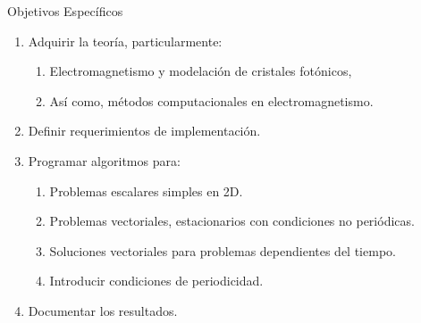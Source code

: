 \documentclass[xcolor=table,serif,handout]{beamer}
\begin{document}
		\begin{frame}
		\begin{block}{Objetivos Espec\'ificos}
	    \begin{enumerate}
			\item Adquirir la teoría, particularmente:
			\begin{enumerate}
				\item Electromagnetismo y modelación de cristales fotónicos, 
	 			\item Así como, métodos computacionales en  electromagnetismo.
	 		\end{enumerate}
			\item Definir requerimientos de implementación. 
			\item Programar algoritmos para:
				\begin{enumerate}
					\item Problemas escalares simples en 2D.	
					\item Problemas vectoriales, estacionarios con condiciones no periódicas.
					\item Soluciones vectoriales para problemas dependientes del tiempo.
					\item Introducir condiciones de periodicidad.
				\end{enumerate}
			\item Documentar los resultados.
		\end{enumerate}
		\end{block}
	\end{frame}
\end{document}
